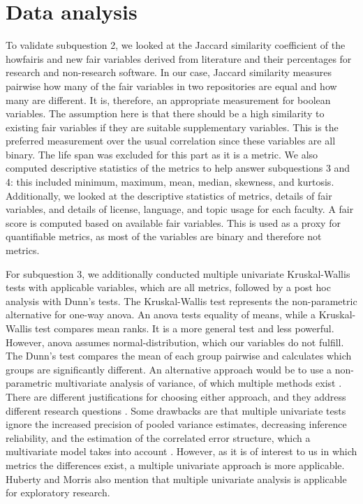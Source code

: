 \section{Data analysis}
\label{sec:dataexplore}
To validate subquestion 2, we looked at the Jaccard similarity coefficient \cite{kosub_note_2016} of the howfairis and new \acrshort{fair} variables derived from literature and their percentages for research and non-research software. 
In our case, Jaccard similarity measures pairwise how many of the \acrshort{fair} variables in two repositories are equal and how many are different. It is, therefore, an appropriate measurement for boolean variables. 
The assumption here is that there should be a high similarity to existing \acrshort{fair} variables if they are suitable supplementary variables. This is the preferred measurement over the usual correlation since these variables are all binary. The life span was excluded for this part as it is a metric. We also computed descriptive statistics of the metrics to help answer subquestions 3 and 4: this included minimum, maximum, mean, median, skewness, and kurtosis. Additionally, we looked at the descriptive statistics of metrics, details of \acrshort{fair} variables, and details of license, language, and topic usage for each faculty. A \acrshort{fair} score is computed based on available \acrshort{fair} variables. This is used as a proxy for quantifiable metrics, as most of the variables are binary and therefore not metrics.

For subquestion 3, we additionally conducted multiple univariate Kruskal-Wallis tests with applicable variables, which are all metrics, followed by a post hoc analysis with Dunn's tests. 
The Kruskal-Wallis test represents the non-parametric alternative for one-way \acrfull{anova}. 
An \acrshort{anova} tests equality of means, while a Kruskal-Wallis test compares mean ranks. It is a more general test and less powerful. However, \acrshort{anova} assumes normal-distribution, which our variables do not fulfill. The Dunn’s test compares the mean of each group pairwise and calculates which groups are significantly different.
An alternative approach would be to use a non-parametric multivariate analysis of variance, of which multiple methods exist \cite{anderson_new_2001, katz_multivariate_1980}. There are different justifications for choosing either approach, and they address different research questions \cite{huberty_multivariate_1989}. Some drawbacks are that multiple univariate tests ignore the increased precision of pooled variance estimates, decreasing inference reliability, and the estimation of the correlated error structure, which a multivariate model takes into account \cite{alexis_answer_2015}. However, as it is of interest to us in which metrics the differences exist, a multiple univariate approach is more applicable. Huberty and Morris \cite{huberty_multivariate_1989} also mention that multiple univariate analysis is applicable for exploratory research.

